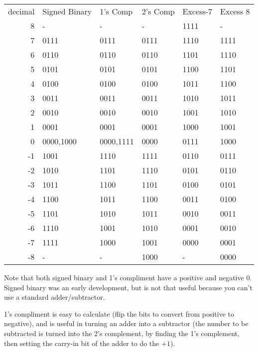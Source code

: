 \begin{tabular}{rlllll}
decimal & Signed Binary & 1's Comp  & 2's Comp & Excess-7 & Excess 8 \\
 8      & -             & -         & -        & 1111     & -        \\
 7      & 0111          & 0111      & 0111     & 1110     & 1111     \\
 6      & 0110          & 0110      & 0110     & 1101     & 1110     \\
 5      & 0101          & 0101      & 0101     & 1100     & 1101     \\
 4      & 0100          & 0100      & 0100     & 1011     & 1100     \\
 3      & 0011          & 0011      & 0011     & 1010     & 1011     \\
 2      & 0010          & 0010      & 0010     & 1001     & 1010     \\
 1      & 0001          & 0001      & 0001     & 1000     & 1001     \\
 0      & 0000,1000     & 0000,1111 & 0000     & 0111     & 1000     \\
-1      & 1001          & 1110      & 1111     & 0110     & 0111     \\
-2      & 1010          & 1101      & 1110     & 0101     & 0110     \\
-3      & 1011          & 1100      & 1101     & 0100     & 0101     \\
-4      & 1100          & 1011      & 1100     & 0011     & 0100     \\
-5      & 1101          & 1010      & 1011     & 0010     & 0011     \\
-6      & 1110          & 1001      & 1010     & 0001     & 0010     \\
-7      & 1111          & 1000      & 1001     & 0000     & 0001     \\
-8      & -             & -         & 1000     & -        & 0000     \\
\end{tabular}

Note that both signed binary and 1's compliment have a positive and negative 0.  Signed binary was an early development, but is not that useful because you can't use a standard adder/subtractor.

1's compliment is easy to calculate (flip the bits to convert from positive to negative), and is useful in turning an adder into a subtractor (the number to be subtracted is turned into the 2's complement, by finding the 1's complement, then setting the carry-in bit of the adder to do the $+1$).

